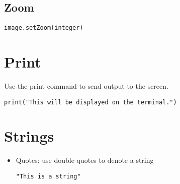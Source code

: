 \documentclass{article}
\begin{document}
\subsection{Zoom}
\begin{lstlisting}
image.setZoom(integer)
\end{lstlisting}

\section{Print}
Use the print command to send output to the screen.

\begin{lstlisting}
print("This will be displayed on the terminal.")
\end{lstlisting}

\section{Strings}

\begin{itemize}
  \item Quotes: use double quotes to denote a string
\begin{lstlisting}
"This is a string"
\end{lstlisting}

\end{itemize}

\newpage

%

\end{document}
